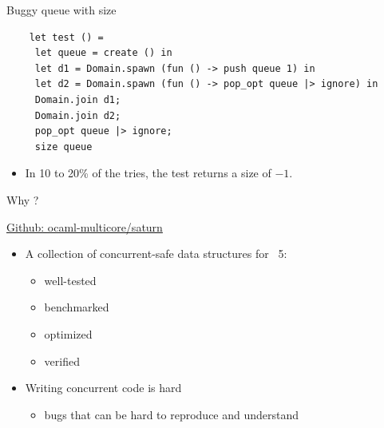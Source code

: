 \begin{frame}[fragile]{Buggy queue with size}
    \begin{lstlisting}
    let test () =
     let queue = create () in
     let d1 = Domain.spawn (fun () -> push queue 1) in 
     let d2 = Domain.spawn (fun () -> pop_opt queue |> ignore) in 
     Domain.join d1;
     Domain.join d2;
     pop_opt queue |> ignore;
     size queue
    \end{lstlisting}

    \begin{itemize}
        \item<2-> In 10 to 20\% of the tries, the test returns a size of $-1$. 
    \end{itemize}
\end{frame}

\begin{frame}{Why \Saturn ?}
    \hfill\small{\href{https://github.com/ocaml-multicore/saturn}{Github: ocaml-multicore/saturn}
    \vfill
        \begin{itemize}[label=$\bullet$]
            \item A collection of concurrent-safe data structures for \OCaml~5: 
            \begin{itemize}[label=$\diamond$]
                \item well-tested
                \item benchmarked
                \item optimized
                \item verified
            \end{itemize}
            \item Writing concurrent code is hard 
            \begin{itemize}[label=$\diamond$]
                \item bugs that can be hard to reproduce and understand
            \end{itemize}  
        \end{itemize}
        }
        \vfill
\end{frame}

